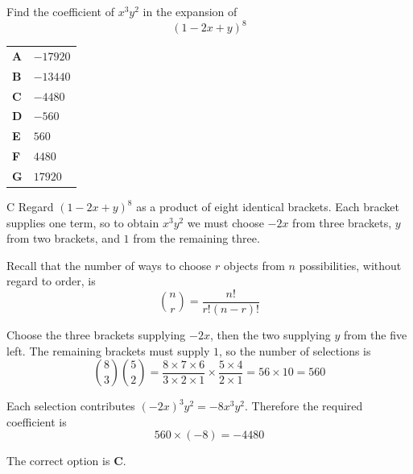 \documentclass[11pt,a4paper]{article}
\begin{document}
\clearpage
\thispagestyle{djssolutions}
\vspace*{8pt}
\begin{enumerate}[label=\textbf{\arabic*.},leftmargin=*,itemsep=0pt,start=11]
Find the coefficient of $x^3y^2$ in the expansion of \[(1-2x+y)^8\]

\par\vspace*{12pt}
\begin{tabularx}{\linewidth}{@{}>{\bfseries}l Y@{}}
A &
$-17920$
\\[0.8em]
B &
$-13440$
\\[0.8em]
C &
$-4480$
\\[0.8em]
D &
$-560$
\\[0.8em]
E &
$560$
\\[0.8em]
F &
$4480$
\\[0.8em]
G &
$17920$
\\
\end{tabularx}

\begin{djsSolution}{C}
Regard $(1-2x+y)^8$ as a product of eight identical brackets. Each bracket supplies one term, so to obtain $x^3y^2$ we must choose $-2x$ from three brackets, $y$ from two brackets, and $1$ from the remaining three.

Recall that the number of ways to choose $r$ objects from $n$ possibilities, without regard to order, is
\[
\binom{n}{r}=\frac{n!}{r!(n-r)!}
\]

Choose the three brackets supplying $-2x$, then the two supplying $y$ from the five left. The remaining brackets must supply $1$, so the number of selections is
\[
\binom83\binom52
=\frac{8\times7\times6}{3\times2\times1}
 \times\frac{5\times4}{2\times1}
=56\times10=560
\]

Each selection contributes $(-2x)^3y^2=-8x^3y^2$. Therefore the required coefficient is
\[
560\times(-8)=\boxed{-4480}
\]

The correct option is \textbf{C}.\\[5pt]


\end{djsSolution}
\end{enumerate}
\end{document}
